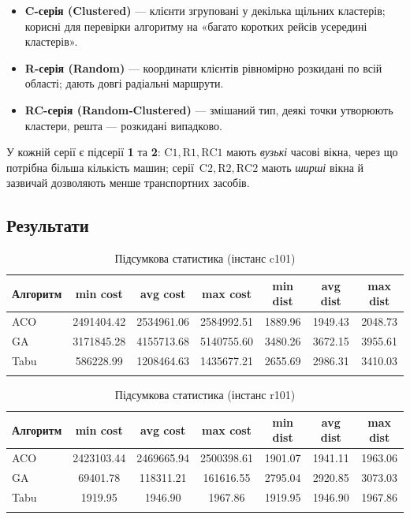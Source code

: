 \documentclass[12pt,a4paper]{article}
\begin{document}
\begin{itemize}
  \item \textbf{C-серія (Clustered)} — клієнти згруповані у декілька щільних
        кластерів; корисні для перевірки алгоритму на
        «багато коротких рейсів усередині кластерів».
  \item \textbf{R-серія (Random)} — координати клієнтів рівномірно
        розкидані по всій області; дають довгі радіальні маршрути.
  \item \textbf{RC-серія (Random‐Clustered)} — змішаний тип,
        деякі точки утворюють кластери, решта — розкидані випадково.
\end{itemize}

У кожній серії є підсерії \textbf{1} та \textbf{2}:
\(\text{C}1, \text{R}1, \text{RC}1\) мають \emph{вузькі} часові вікна,  
через що потрібна більша кількість машин;  
серії~\(\text{C}2, \text{R}2, \text{RC}2\) мають
\emph{ширші} вікна й зазвичай дозволяють менше транспортних засобів.

\subsection{Результати}
\begin{longtable}{lcccccc}
\toprule
Алгоритм & min cost & avg cost & max cost & min dist & avg dist & max dist\\ 
\midrule
ACO  & 2491404.42  & 2534961.06  & 2584992.51 & 1889.96 & 1949.43 & 2048.73\\
GA   & 3171845.28  & 4155713.68 & 5140755.60 & 3480.26 & 3672.15 & 3955.61\\
Tabu & 586228.99  & 1208464.63 & 1435677.21 & 2655.69  & 2986.31 & 3410.03\\
\bottomrule
\caption{Підсумкова статистика (інстанс c101)}
\end{longtable}

\begin{longtable}{lcccccc}
\toprule
Алгоритм & min cost & avg cost & max cost & min dist & avg dist & max dist\\ 
\midrule
ACO  & 2423103.44  & 2469665.94  & 2500398.61 & 1901.07  & 1941.11  & 1963.06\\
GA   & 69401.78   & 118311.21  & 161616.55 & 2795.04  & 2920.85 & 3073.03\\
Tabu & 1919.95   & 1946.90 & 1967.86 & 1919.95  & 1946.90 & 1967.86\\
\bottomrule
\caption{Підсумкова статистика (інстанс r101)}
\end{longtable}
\end{document}
